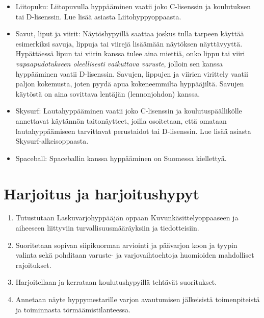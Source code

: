 \begin{itemize}
\item  Liitopuku: Liitopuvulla hyppääminen vaatii joko C-lisenssin ja koulutuksen tai D-lisenssin. Lue lisää asiasta Liitohyppyoppaasta. 
\item  Savut, liput ja viirit: Näytöshypyillä saattaa joskus tulla tarpeen käyttää esimerkiksi savuja, lippuja tai viirejä lisäämään näytöksen näyttävyyttä. Hypättäessä lipun tai viirin kanssa tulee aina miettiä, onko lippu tai viiri \textit{vapaapudotukseen oleellisesti vaikuttava varuste}, jolloin sen kanssa hyppääminen vaatii D-lisenssin. Savujen, lippujen ja viirien virittely vaatii paljon kokemusta, joten pyydä apua kokeneemmilta hyppääjiltä. Savujen käytöstä on aina sovittava lentäjän (lennonjohdon) kanssa. 
\item  Skysurf: Lautahyppääminen vaatii joko C-lisenssin  ja koulutuspäällikölle annettavat käytännön taitonäytteet, joilla osoitetaan, että omataan lautahyppäämiseen tarvittavat perustaidot tai D-lisenssin. Lue lisää asiasta Skysurf-alkeisoppaasta. 
\item  Spaceball: Spaceballin kanssa hyppääminen on Suomessa kiellettyä. 
\end{itemize}
\section{ Harjoitus ja harjoitushypyt }
\label{omiin-varusteisiin-siirtyminen-harjoitus-ja-harjoitushypyt}

\begin{enumerate}[label=\bfseries \arabic*)]
\item  Tutustutaan Laskuvarjohyppääjän oppaan Kuvunkäsittelyoppaaseen ja aiheeseen liittyviin turvallisuusmääräyksiin ja tiedotteisiin. 
\item  Suoritetaan sopivan siipikuorman arviointi ja päävarjon koon ja tyypin valinta sekä pohditaan varuste- ja varjovaihtoehtoja huomioiden mahdolliset rajoitukset. 
\item  Harjoitellaan ja kerrataan koulutushypyillä tehtävät suoritukset. 
\item  Annetaan näyte hyppymestarille varjon avautumisen jälkeisistä toimenpiteistä ja toiminnasta törmäämistilanteessa. 
\end{enumerate}
